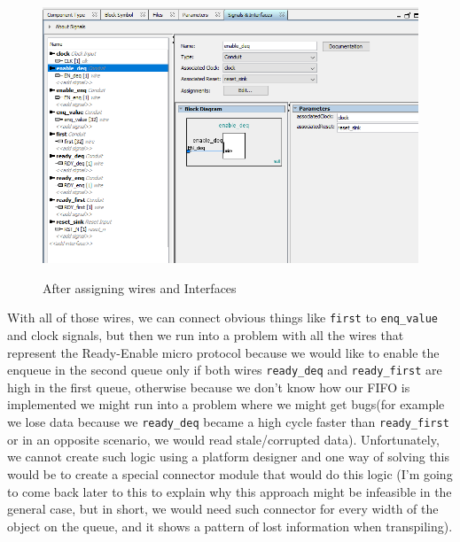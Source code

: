 \documentclass[12pt]{report}
\begin{document}
\begin{figure}[H] 
    \caption{After assigning wires and Interfaces} 
    \includegraphics[width=\textwidth]{images/Example1AfterOrganization.png} \\ \centering 
\end{figure} 
With all of those wires, we can connect obvious things like \verb!first! to \verb!enq_value! and clock signals, but then we run into a problem with all the wires that represent the Ready-Enable micro protocol because we would like to enable the enqueue in the second queue only if both wires \verb!ready_deq! and \verb!ready_first! are high in the first queue, otherwise because we don't know how our FIFO is implemented we might run into a problem where we might get bugs(for example we lose data because we \verb!ready_deq! became a high cycle faster than \verb!ready_first! or in an opposite scenario, we would read stale/corrupted data).
Unfortunately, we cannot create such logic using a platform designer and one way of solving this would be to create a special connector module that would do this logic (I'm going to come back later to this to explain why this approach might be infeasible in the general case, but in short, we would need such connector for every width of the object on the queue, and it shows a pattern of lost information when transpiling). 
\end{document}
